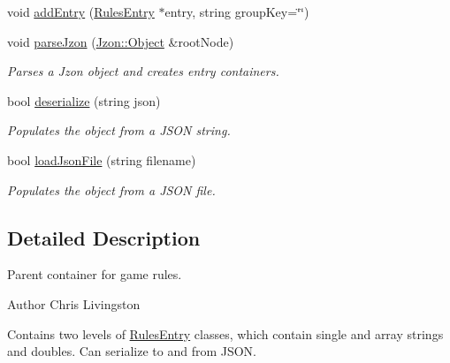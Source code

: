 \begin{DoxyCompactItemize}
void \hyperlink{class_rules_1_1_rules_container_ae5d66750a18e8d7e459b35744f83e1b6}{add\-Entry} (\hyperlink{class_rules_1_1_rules_entry}{Rules\-Entry} $\ast$entry, string group\-Key=\char`\"{}\char`\"{})
\item 
void \hyperlink{class_rules_1_1_rules_container_a3ac0f88738f539811d18ddc201db870f}{parse\-Jzon} (\hyperlink{class_jzon_1_1_object}{Jzon\-::\-Object} \&root\-Node)
\begin{DoxyCompactList}\small\item\em Parses a Jzon object and creates entry containers. \end{DoxyCompactList}\item 
bool \hyperlink{class_rules_1_1_rules_container_a590395736d28b189773f563d615eeec2}{deserialize} (string json)
\begin{DoxyCompactList}\small\item\em Populates the object from a J\-S\-O\-N string. \end{DoxyCompactList}\item 
bool \hyperlink{class_rules_1_1_rules_container_a9ed1c6da6d99331f3ce79148c275c1f6}{load\-Json\-File} (string filename)
\begin{DoxyCompactList}\small\item\em Populates the object from a J\-S\-O\-N file. \end{DoxyCompactList}\end{DoxyCompactItemize}


\subsection{Detailed Description}
Parent container for game rules. 

\begin{DoxyAuthor}{Author}
Chris Livingston
\end{DoxyAuthor}
Contains two levels of \hyperlink{class_rules_1_1_rules_entry}{Rules\-Entry} classes, which contain single and array strings and doubles. Can serialize to and from J\-S\-O\-N. 

